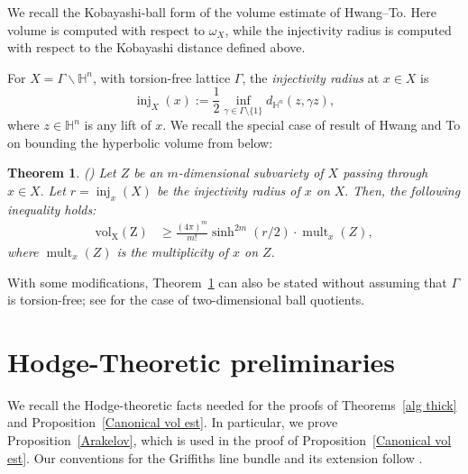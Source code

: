 \documentclass[12 pt]{amsart}
\newtheorem{theorem}{Theorem}[section]
\theoremstyle{definition}
\newcommand{\Hu}{\mathbb{H}}
\begin{document}
We recall the Kobayashi-ball form of the volume estimate of
Hwang--To. Here volume is computed with respect to
$\omega_X$, while the injectivity radius is computed with respect to
the Kobayashi distance defined above. 

For \(X=\Gamma\backslash\mathbb H^n\), with torsion-free lattice $\Gamma$, the \emph{injectivity radius} at \(x\in X\) is
\[
\operatorname{inj}_{X}(x)
:=
\frac12\inf_{\gamma\in\Gamma\setminus\{1\}}
d_{\Hu^n}(z,\gamma z),
\]
where \(z\in\mathbb H^n\) is any lift of \(x\). We recall the special case of result of Hwang and To on bounding the hyperbolic volume
from below:

\begin{theorem}(\cite[Theorem 1.1]{hwang2002volumes}) \label{Hwang--To}Let $Z$ be an $m$-dimensional subvariety of $X$ passing through $x\in X.$ Let $r=\operatorname{inj}_{x}(X)$ be the injectivity radius of $x$ on $X.$ Then, the following inequality holds:
\begin{align} \label{Hwanginequilty} 
\operatorname{vol_{X}(Z)}
&\ge
\frac{(4\pi)^m}{m!}\sinh^{2m}(r/2)\cdot \operatorname{mult}_x(Z),
\end{align} 
where $\operatorname{mult}_x(Z)$ is the multiplicity of $x$ on $Z.$
\end{theorem}

With some modifications, Theorem~\ref{Hwang--To} can also be
stated without assuming that $\Gamma$ is torsion-free; see
\cite[Theorem~4.1]{li2025curves} for the case of two-dimensional ball quotients.



\section{Hodge-Theoretic preliminaries}

We recall the Hodge-theoretic facts needed for the proofs of Theorems~\ref{alg thick} and Proposition~\ref{Canonical vol est}. In particular, we prove Proposition~\ref{Arakelov}, which is used in the proof of Proposition~\ref{Canonical vol est}. Our conventions for the Griffiths line bundle and its extension follow \cite[\S\S2--3]{brunebarbe2020increasing}. 
\end{document}
